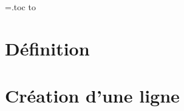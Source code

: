 \documentclass{article}
\begin{document}
\newread\tocin
\openin\tocin=\jobname.toc
\ifeof\tocin\else
  \readline\tocin to\x
  \texttt{\meaning\x}
\fi
\closein\tocin
\tableofcontents
\section{Définition}
\section{Création d’une ligne}
\end{document}
